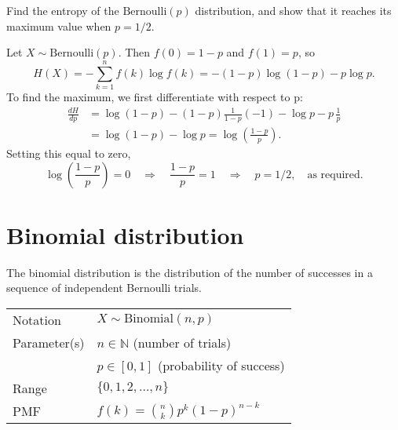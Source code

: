 \newpage
\begin{example}
Find the entropy of the $\text{Bernoulli}(p)$ distribution, and show that it reaches its maximum value when $p=1/2$.
\end{example}

\begin{solution}
Let $X\sim\text{Bernoulli}(p)$. Then $f(0)=1-p$ and $f(1)=p$, so
\[
H(X) = -\sum_{k=1}^n f(k)\log f(k) = -(1-p)\log(1-p) - p\log p.
\]
To find the maximum, we first differentiate with respect to p:
\begin{align*}
\frac{dH}{dp} 
	& = \log(1-p) -(1-p)\frac{1}{1-p}(-1) - \log p - p\,\frac{1}{p} \\
	& = \log(1-p) - \log p = \log\left(\frac{1-p}{p}\right).
\end{align*}
Setting this equal to zero,
\[
\log\left(\frac{1-p}{p}\right) = 0
\quad\Rightarrow\quad
\frac{1-p}{p} = 1
\quad\Rightarrow\quad
p = 1/2, \quad\text{as required.}
\]
\end{solution}


\section{Binomial distribution}


The binomial distribution is the distribution of the number of successes in a sequence of independent Bernoulli trials.

\begin{center}
\begin{tabular}{ll}\hline
Notation			& $X\sim\text{Binomial}(n,p)$ \\
Parameter(s)		& $n \in\mathbb{N}$ \qquad (number of trials) \\
				& $p \in[0,1]$ \quad (probability of success) \\
Range			& $\{0,1,2,\ldots,n\}$ \\
PMF				& $f(k) = \displaystyle\binom{n}{k}p^k(1-p)^{n-k}$\\[2ex] \hline
\end{tabular}
\end{center}

